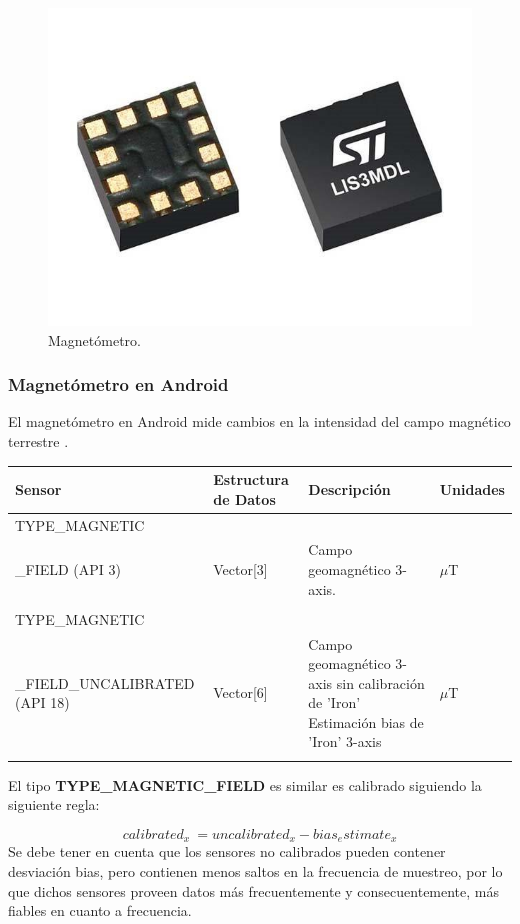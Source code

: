 \begin{figure}[H]
	\centering
	\includegraphics[scale=0.5]{imagenes/magnetometer.jpg}
	\caption{Magnetómetro.}
	\label{Magnetometro}
\end{figure}

\subsubsection{Magnetómetro en Android}

El magnetómetro en Android mide cambios en la intensidad del campo magnético terrestre .

\begin{table}[H]
\centering
    \begin{tabular}{p{5.0cm} p{2.0cm} p{5.0cm} p{2.0cm}}%
    \hline
    Sensor & Estructura de Datos & Descripción & Unidades \\ \hline
    TYPE\_MAGNETIC\\\_FIELD (API 3) & Vector[3] & Campo geomagnético  3-axis. & $\mu$T \\\\ \hline
    TYPE\_MAGNETIC\\\_FIELD\_UNCALIBRATED (API 18) & Vector[6] & Campo geomagnético  3-axis sin calibración de 'Iron'  Estimación bias de 'Iron' 3-axis  & $\mu$T \\ \\ \hline
    \end{tabular}
\end{table}
\noindent
El tipo \textbf{TYPE\_MAGNETIC\_FIELD} es similar es calibrado siguiendo la siguiente regla:

\[calibrated_x ~= uncalibrated_x - bias_estimate_x\]
\noindent
Se debe tener en cuenta que los sensores no calibrados pueden contener desviación bias, pero contienen menos saltos en la frecuencia de muestreo, por lo que dichos sensores proveen datos más frecuentemente y consecuentemente, más fiables en cuanto a frecuencia.
